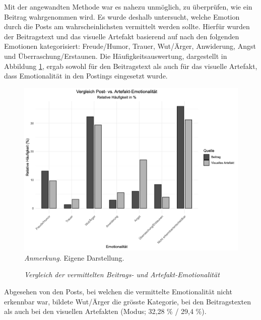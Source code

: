 \documentclass[12pt,a4paper]{article}        %
\begin{document}
\pagebreak
Mit der angewandten Methode war es nahezu unmöglich, zu überprüfen, wie ein Beitrag wahrgenommen wird. Es wurde deshalb untersucht, welche Emotion durch die Posts am wahrscheinlichsten vermittelt werden sollte. Hierfür wurden der Beitragstext und das visuelle Artefakt basierend auf \textcite[1164]{russell_circumplex_1980} nach den folgenden Emotionen kategorisiert: Freude/Humor, Trauer, Wut/Ärger, Anwiderung, Angst und Überraschung/Erstaunen.
Die Häufigkeitsauswertung, dargestellt in Abbildung \ref{fig:results_sentiment_plot}, ergab sowohl für den Beitragstext als auch für das visuelle Artefakt, dass Emotionalität in den Postings eingesetzt wurde.

\begin{figure}[H]
  \caption{\textit{Vergleich der vermittelten Beitrags- und Artefakt-Emotionalität}}
  \label{fig:results_sentiment_plot}
  \centering
  \includegraphics[width=1\linewidth]{images/sentiment_plot.png}
  \footnotesize\textit{Anmerkung.} Eigene Darstellung.
\end{figure}
Abgesehen von den Posts, bei welchen die vermittelte Emotionalität nicht erkennbar war, bildete Wut/Ärger die grösste Kategorie, bei den Beitragstexten als auch bei den visuellen Artefakten (Modus; 32,28 \% / 29,4 \%).
\end{document}
